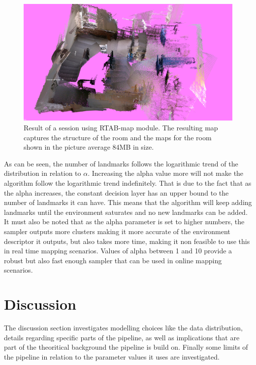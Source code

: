 \documentclass[twoside,hidelinks]{article}
\begin{document}
\begin{figure}[ht!]
  \centering
    \includegraphics[width=.8\textwidth]{rtabmap}
    \caption{Result of a session using RTAB-map module. The resulting map captures the structure of the room and the maps for the room shown in the picture average 84MB in size.}
  \label{rtabmap}
\end{figure}



As can be seen, the number of landmarks follows the logarithmic trend of the distribution in relation to $\alpha$. Increasing the alpha value more will not make the algorithm follow the logarithmic trend indefinitely. That is due to the fact that as the alpha increases, the constant decision layer has an upper bound to the number of landmarks it can have. This means that the algorithm will keep adding landmarks until the environment saturates and no new landmarks can be added. It must also be noted that as the alpha parameter is set to higher numbers, the sampler outputs more clusters making it more accurate of the environment descriptor it outputs, but also takes more time, making it non feasible to use this in real time mapping scenarios. Values of alpha between 1 and 10 provide a robust but also fast enough sampler that can be used in online mapping scenarios.



\newpage
\section{Discussion}
\label{sec:discussion}

The discussion section investigates modelling choices like the data distribution, details regarding specific parts of the pipeline, as well as implications that are part of the theoritical background the pipeline is build on. Finally some limits of the pipeline in relation to the parameter values it uses are investigated.
\end{document}
